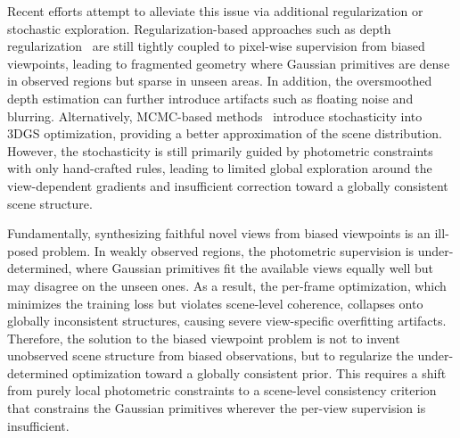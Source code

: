 \documentclass[lettersize,journal]{IEEEtran}
\begin{document}
Recent efforts attempt to alleviate this issue via additional regularization or stochastic exploration. Regularization-based approaches such as depth regularization~\cite{pgsr,hierarchical,mpgs}
are still tightly coupled to pixel-wise supervision from biased viewpoints, 
leading to fragmented geometry where Gaussian primitives are dense in observed regions but sparse in unseen areas.
In addition, the oversmoothed depth estimation can further introduce artifacts such as floating noise and blurring.
Alternatively, MCMC-based methods~\cite{mcmc,mh3dgs} introduce stochasticity into 3DGS optimization, providing a better approximation of the scene distribution.
However, the stochasticity is still primarily guided by photometric constraints with only hand-crafted rules, leading to limited global exploration around the view-dependent gradients and insufficient correction toward a globally consistent scene structure.

Fundamentally, synthesizing faithful novel views from biased viewpoints is an ill-posed problem. 
In weakly observed regions, the photometric supervision is under-determined, where Gaussian primitives fit the available views equally well but may disagree on the unseen ones. As a result, the per-frame optimization, which minimizes the training loss but violates scene-level coherence, collapses onto globally inconsistent structures, causing severe view-specific overfitting artifacts.
Therefore, the solution to the biased viewpoint problem is not to invent unobserved scene structure from biased observations, but to regularize the under-determined optimization toward a globally consistent prior.
This requires a shift from purely local photometric constraints to a scene-level consistency criterion that constrains the Gaussian primitives wherever the per-view supervision is insufficient.
\end{document}
